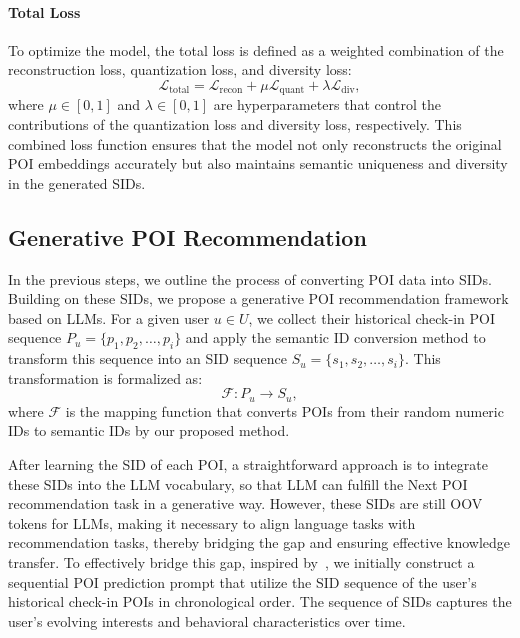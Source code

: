 \paragraph{Total Loss} 

To optimize the model, the total loss is defined as a weighted combination of the reconstruction loss, quantization loss, and diversity loss:
\begin{equation}
     \mathcal{L}_{\text{total}} = \mathcal{L}_{\text{recon}} + \mu \mathcal{L}_{\text{quant}} + \lambda \mathcal{L}_{\text{div}},   
\label{equ:total-loss}
\end{equation}
where $\mu \in [0, 1]$ and $\lambda \in [0, 1]$ are hyperparameters that control the contributions of the quantization loss and diversity loss, respectively. 
This combined loss function ensures that the model not only reconstructs the original POI embeddings accurately but also maintains semantic uniqueness and diversity in the generated SIDs.

\subsection{Generative POI Recommendation}
\label{fine-tune}

In the previous steps, we outline the process of converting POI data into SIDs. 
Building on these SIDs, we propose a generative POI recommendation framework based on LLMs. 
For a given user $u \in U$, we collect their historical check-in POI sequence $P_u = \{p_1, p_2, \dots, p_i\}$ and apply the semantic ID conversion method to transform this sequence into an SID sequence $S_u = \{s_1, s_2, \dots, s_i\}$. 
This transformation is formalized as:
\begin{equation}
    \mathcal{F}: P_u \rightarrow S_u,
\end{equation}
where $\mathcal{F}$ is the mapping function that converts POIs from their random numeric IDs to semantic IDs by our proposed method. 

After learning the SID of each POI, a straightforward approach is to integrate these SIDs into the LLM vocabulary, so that LLM can fulfill the Next POI recommendation task in a generative way. 
However, these SIDs are still OOV tokens for LLMs, making it necessary to align language tasks with recommendation tasks, thereby bridging the gap and ensuring effective knowledge transfer. 
To effectively bridge this gap, inspired by~\cite{Geng2022p5,Xue2022human,Zheng2024LCRec}, we initially construct a sequential POI prediction prompt that utilize the SID sequence of the user's historical check-in POIs in chronological order. The sequence of SIDs captures the user's evolving interests and behavioral characteristics over time.

